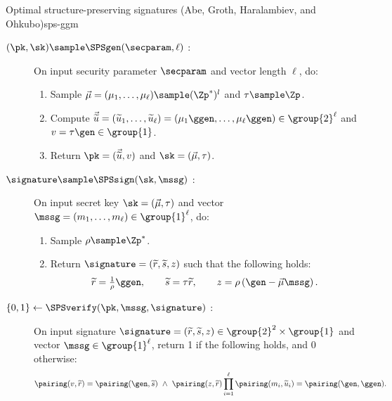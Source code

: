 \begin{primitivebox}{Optimal structure-preserving signatures (Abe, Groth,
  Haralambiev, and Ohkubo)}{sps-ggm}

  \begin{description}

    \item[$(\pk, \sk) \sample \SPSgen(\secparam, \ell)$ :] On input security
      parameter $\secparam$ and vector length $\ell$, do:

      \begin{enumerate}

        \item Sample $\vec{\mu} = (\mu_1, \ldots, \mu_\ell) \sample (\Zp^*)^l$
          and $\tau \sample \Zp$.

        \item Compute $\vec{\widetilde{u}} = (\widetilde{u}_1, \ldots,
          \widetilde{u}_\ell) = (\mu_1 \ggen, \ldots, \mu_\ell \ggen) \in
          \group{2}^\ell$ and ${v} = \tau \gen \in \group{1}$.

        \item Return $\pk = (\vec{\widetilde{u}}, {v})$ and $\sk = (\vec{\mu},
          \tau)$.

      \end{enumerate}

    \item[$\signature \sample \SPSsign(\sk, \mssg)$ :] On input secret key $\sk
      = (\vec{\mu}, \tau)$ and vector $\mssg = ({m}_1, \ldots, m_\ell) \in
      \group{1}^\ell$, do:

      \begin{enumerate}

        \item Sample $\rho \sample \Zp^*$.

        \item Return $\signature = (\widetilde{r}, \widetilde{s}, {z})$ such
          that the following holds:
          \begin{equation*}
            \widetilde{r} = \tfrac{1}{\rho}\ggen, \qquad \widetilde{s} =
            \tau\widetilde{r}, \qquad {z} = \rho\left(\gen -
            \vec{\mu}\mssg\right).
          \end{equation*}

      \end{enumerate}

    \item[$\{0,1\} \leftarrow \SPSverify(\pk, \mssg, \signature)$ :] On input
      signature $\signature = (\widetilde{r}, \widetilde{s}, {z}) \in
      \group{2}^2 \times \group{1}$ and vector $\mssg \in \group{1}^\ell$,
      return 1 if the following holds, and 0 otherwise:
      \begin{equation}
        \pairing({v}, \widetilde{r}) = \pairing(\gen, \widetilde{s}) \ \wedge \
        \pairing({z}, \widetilde{r})\prod_{i=1}^\ell\pairing({m}_i,
        \widetilde{u}_i) = \pairing(\gen, \ggen).
      \end{equation} \label{eq:abe-ver}


\end{description}
\end{primitivebox}
